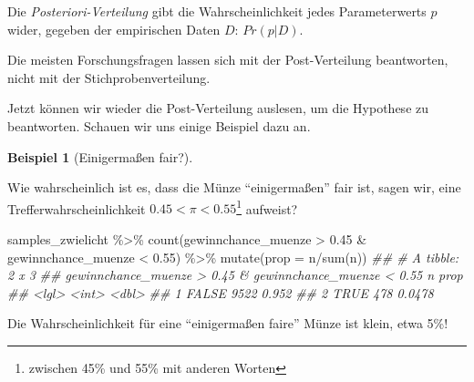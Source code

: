 \documentclass[
  a4paper,
  DIV=11]{scrreprt}
\newenvironment{Shaded}{\begin{snugshade}}{\end{snugshade}}
\newcommand{\AttributeTok}[1]{\textcolor[rgb]{0.40,0.45,0.13}{#1}}
\newcommand{\DocumentationTok}[1]{\textcolor[rgb]{0.37,0.37,0.37}{\textit{#1}}}
\newcommand{\FloatTok}[1]{\textcolor[rgb]{0.68,0.00,0.00}{#1}}
\newcommand{\FunctionTok}[1]{\textcolor[rgb]{0.28,0.35,0.67}{#1}}
\newcommand{\NormalTok}[1]{\textcolor[rgb]{0.00,0.23,0.31}{#1}}
\newcommand{\SpecialCharTok}[1]{\textcolor[rgb]{0.37,0.37,0.37}{#1}}
\theoremstyle{definition}
\newtheorem{example}{Beispiel}[chapter]
\theoremstyle{remark}
\begin{document}
Die \emph{Posteriori-Verteilung} gibt die Wahrscheinlichkeit jedes
Parameterwerts \(p\) wider, gegeben der empirischen Daten \(D\):
\(Pr(p|D)\).

Die meisten Forschungsfragen lassen sich mit der Post-Verteilung
beantworten, nicht mit der Stichprobenverteilung.

Jetzt können wir wieder die Post-Verteilung auslesen, um die Hypothese
zu beantworten. Schauen wir uns einige Beispiel dazu an.

\leavevmode{}%
\begin{example}[Einigermaßen fair?]\label{exm-zwielicht1}

Wie wahrscheinlich ist es, dass die Münze ``einigermaßen'' fair ist,
sagen wir, eine Trefferwahrscheinlichkeit
\(0.45 < \pi < 0.55\)\footnote{zwischen 45\% und 55\% mit anderen Worten}
aufweist?

\begin{Shaded}
\begin{Highlighting}[]
\NormalTok{samples\_zwielicht }\SpecialCharTok{\%\textgreater{}\%} 
  \FunctionTok{count}\NormalTok{(gewinnchance\_muenze }\SpecialCharTok{\textgreater{}} \FloatTok{0.45} \SpecialCharTok{\&}\NormalTok{ gewinnchance\_muenze }\SpecialCharTok{\textless{}} \FloatTok{0.55}\NormalTok{) }\SpecialCharTok{\%\textgreater{}\%} 
  \FunctionTok{mutate}\NormalTok{(}\AttributeTok{prop =}\NormalTok{ n}\SpecialCharTok{/}\FunctionTok{sum}\NormalTok{(n))}
\DocumentationTok{\#\# \# A tibble: 2 x 3}
\DocumentationTok{\#\#   \textasciigrave{}gewinnchance\_muenze \textgreater{} 0.45 \& gewinnchance\_muenze \textless{} 0.55\textasciigrave{}     n   prop}
\DocumentationTok{\#\#   \textless{}lgl\textgreater{}                                                     \textless{}int\textgreater{}  \textless{}dbl\textgreater{}}
\DocumentationTok{\#\# 1 FALSE                                                      9522 0.952 }
\DocumentationTok{\#\# 2 TRUE                                                        478 0.0478}
\end{Highlighting}
\end{Shaded}

Die Wahrscheinlichkeit für eine ``einigermaßen faire'' Münze ist klein,
etwa 5\%!

\end{example}
\end{document}
